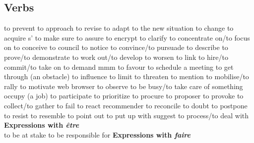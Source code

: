 \subsection*{Verbs}
   {to prevent}
   {to approach}
   {to revise}
   {to adapt}
   {to the new situation}
   {to change}
   {to acquire}
 {s'}   {to make sure}
   {to assure}
   {to encrypt}
   {to clarify}
   {to concentrate on/to focus on}
   {to conceive}
   {to council}
   {to notice}
   {to convince/to pursuade}
   {to describe}
   {to prove/to demonstrate}
   {to work out/to develop}
   {to worsen}
   {to link}
   {to hire/to commit/to take on}
   {to demand}
   {mmm}
   {to favour}
   {to schedule a meeting}
   {to get through (an obstacle)}
   {to influence}
   {to limit}
   {to threaten}
   {to mention}
   {to mobilise/to rally}
   {to motivate}
   {web browser}
   {to observe}
   {to be busy/to take care of something}
   {occupy (a job)}
   {to participate}
   {to prioritize}
   {to procure}
   {to proposer}
   {to provoke}
   {to collect/to gather}
   {to fail}
   {to react}
   {recommender}
   {to reconcile}
   {to doubt}
   {to postpone}
   {to resist}
   {to resemble}
   {to point out}
   {to put up with}
   {suggest}
   {to process/to deal with}
     {\bf Expressions with {\em être}}\\
        {to be at stake}
        {to be responsible for}
     {\bf Expressions with {\em faire}}\\
